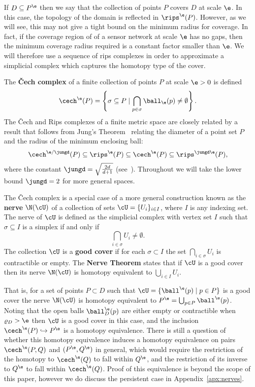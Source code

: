 If $D\subseteq P^\e$ then we say that the collection of points $P$ covers $D$ at scale $\e$.
In this case, the topology of the domain is reflected in $\rips^\e(P)$.
However, as we will see, this may not give a tight bound on the minimum radius for coverage.
In fact, if the coverage region of of a sensor network at scale $\e$ has no gaps, then the minimum coverage radius required is a constant factor smaller than $\e$.
We will therefore use a sequence of rips complexes in order to approximate a simplicial complex which captures the homotopy type of the cover.

The \textbf{\v Cech complex} of a finite collection of points $P$ at scale $\e > 0$ is defined
\[ \cech^\e(P) = \left\{\sigma \subseteq P\mid \bigcap_{p\in \sigma}\ball_\e(p)\neq \emptyset \right\}. \]
The \v Cech and Rips complexes of a finite metric space are closely related by a result that follows from Jung's Theorem~\cite{jung01uber} relating the diameter of a point set $P$ and the radius of the minimum enclosing ball:
\[\cech^{\e/\jungd}(P)\subseteq\rips^\e(P)\subseteq\cech^\e(P)\subseteq\rips^{\jungd\e}(P),\]
where the constant $\jungd = \sqrt{\frac{2d}{d+1}}$ (see~\cite{buchet15efficient}).
Throughout we will take the lower bound $\jungd = 2$ for more general spaces.

The \v Cech complex is a special case of a more general construction known as the \textbf{nerve} $\N(\cU)$ of a collection of sets $\cU = \{U_i\}_{i\in I}$, where $I$ is any indexing set.
The nerve of $\cU$ is defined as the simplicial complex with vertex set $I$ such that $\sigma\subseteq I$ is a simplex if and only if
\[
  \bigcap_{i\in \sigma} U_i\neq \emptyset.
\]
The collection $\cU$ is a \textbf{good cover} if for each $\sigma\subset I$ the set $\bigcap_{i\in\sigma} U_i$ is contractible or empty.
The \textbf{Nerve Theorem} states that if $\cU$ is a good cover then its nerve $\N(\cU)$ is homotopy equivalent to $\bigcup_{i\in I} U_i$.

That is, for a set of points $P\subset D$ such that $\cU = \{\ball^\e(p)\mid p\in P\}$ is a good cover the nerve $\N(\cU)$ is homotopy equivalent to $P^\e = \bigcup_{p\in P} \ball^\e(p)$.
Noting that the open balls $\ball^\e_D(p)$ are either empty or contractible when $\varrho_D > \e$ then $\cU$ is a good cover in this case, and the inclusion $\cech^\e(P)\hookrightarrow P^\e$ is a homotopy equivalence.
There is still a question of whether this homotopy equivalence induces a homotopy equivalence on pairs $\cech^\e(P,Q)$ and $(P^\e, Q^\e)$ in general, which would require the restriction of the homotopy to $\cech^\e(Q)$ to fall within $Q^\e$, and the restriction of its inverse to $Q^\e$ to fall within $\cech^\e(Q)$.
Proof of this equivalence is beyond the scope of this paper, however we do discuss the persistent case in Appendix~\ref{apx:nerves}.
